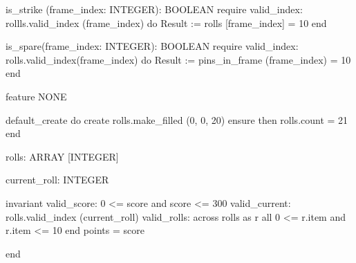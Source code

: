     is_strike (frame_index: INTEGER): BOOLEAN
        require
            valid_index: rollls.valid_index (frame_index)
        do
            Result := rolls [frame_index] = 10
        end
    
    is_spare(frame_index: INTEGER): BOOLEAN
    require
        valid_index: rolls.valid_index(frame_index)
    do
        Result := pins_in_frame (frame_index) = 10
    end
        
feature {NONE}
    
    default_create
        do
            create rolls.make_filled (0, 0, 20)
        ensure then
            rolls.count = 21
        end

rolls: ARRAY [INTEGER]

current_roll: INTEGER


invariant
    valid_score: 0 <= score and score <= 300
    valid_current: rolls.valid_index (current_roll)
    valid_rolls: across rolls as r all 0 <= r.item and r.item <= 10 end
    points = score

end
